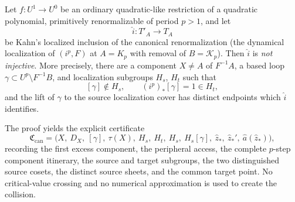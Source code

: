 \begin{theorem}\label{thm:forced-collision}
Let \(f\colon U^1\to U^0\) be an ordinary quadratic-like restriction of a quadratic polynomial, primitively renormalizable of period \(p>1\), and let
\[
 \widehat i\colon T'_A\longrightarrow T_A
\]
be Kahn's localized inclusion of the canonical renormalization (the dynamical localization of \((i^p,F)\) at \(A=K_p\) with removal of \(B=\mathcal K_p\)).  Then \(\widehat i\) is \emph{not injective}.  More precisely, there are a component \(X\ne A\) of \(F^{-1}A\), a based loop \(\gamma\subset U^p\setminus F^{-1}B\), and localization subgroups \(H_s\), \(H_t\) such that
\[
 [\gamma]\notin H_s,\qquad (i^p)_*[\gamma]=1\in H_t,   \tag{1.2}
\]
and the lift of \(\gamma\) to the source localization cover has distinct endpoints which \(\widehat i\) identifies.
\end{theorem}

\begin{remark}\label{rem:collision-certificate}
The proof yields the explicit certificate
\[
 \mathfrak C_{\mathrm{can}}=\bigl(X,\ D_X,\ [\gamma],\ \tau(X),\ H_s,\ H_t,\ H_s,\ H_s[\gamma],\ \widehat z_*,\ \widehat z_*',\ \widehat a(\widehat z_*)\bigr),  \tag{6.3}
\]
recording the first excess component, the peripheral access, the complete \(p\)-step component itinerary, the source and target subgroups, the two distinguished source cosets, the distinct source sheets, and the common target point.  No critical-value crossing and no numerical approximation is used to create the collision.
\end{remark}

